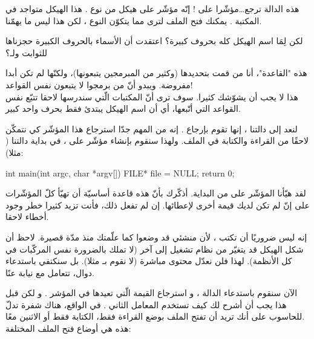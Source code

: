 هذه الدالة ترجع\dots مؤشّرا على
!
إنّه مؤشّر على هيكل من نوع
.
هذا الهيكل متواجد في المكتبة
.
يمكنك فتح الملف لترى مما يتكوّن النوع
،
لكن هذا ليس ما يهمّنا.

\begin{question}
  لكن لِمَا اسم الهيكل كله بحروف كبيرة؟ اعتقدت أن الأسماء بالحروف الكبيرة حجزناها للثوابت ولـ؟
\end{question}

هذه "القاعدة"، أنا من قمت بتحديدها (وكثير من المبرمجين يتبعونها)، ولكنّها لم تكن أبدا مفروضة. ويبدو أنّ من برمجوا
لا يتبعون نفس القواعد!\\
هذا لا يجب أن يشوّشك كثيرا. سوف ترى أنّ المكتبات الّتي سندرسها لاحقا تتبّع نفس القواعد التي أتّبعها، أي أن اسم الهيكل يبتدئ فقط بحرف واحد كبير.

لنعد إلى دالتنا
،
إنها تقوم بإرجاع
.
إنه من المهم جدّا استرجاع هذا المؤشّر كي نتمكّن لاحقًا من القراءة والكتابة في الملف.  ولهذا سنقوم بإنشاء مؤشّر على
،
في بداية دالتنا
(
مثلا):

\begin{Csource}
int main(int argc, char *argv[])
{
	FILE* file = NULL;
	return 0;
}
\end{Csource}

لقد هيّأنا المؤشّر على
من البداية. أذكّرك بأنّ هذه قاعدة أساسيّة أن تهيّأ كلّ المؤشّرات على
إنّ لم تكن لديك قيمة أخرى لإعطائها. إن لم تفعل ذلك، فأنت تزيد كثيرا خطر وجود أخطاء لاحقا.

\begin{information}
  إنه ليس ضروريًا أن تكتب
،
لأن منشئي
قد وضعوا
كما علّمتك منذ مدّة قصيرة.
لاحظ أن شكل الهيكل قد يتغيّر من نظام تشغيل إلى آخر (لا تملك بالضرورة نفس المركّبات في كل الأنظمة). لهذا فلن نعدّل محتوى
مباشرة (لا نقوم بـ
مثلا). بل سنكتفي باستدعاء دوال، تتعامل مع
نيابة عنًا.
\end{information}

الآن سنقوم باستدعاء الدالة
،
و استرجاع القيمة الّتي تعيدها في المؤشر
.
و لكن قبل هذا يجب أن أشرح لك كيف تستخدم المعامل الثاني
.
في الواقع، هناك شفرة تدلّ للحاسوب على أنك تريد أن تفتح الملف بوضع القراءة فقط، الكتابة فقط أو الاثنين معًا.\\
هذه هي أوضاع فتح الملف المختلفة:

